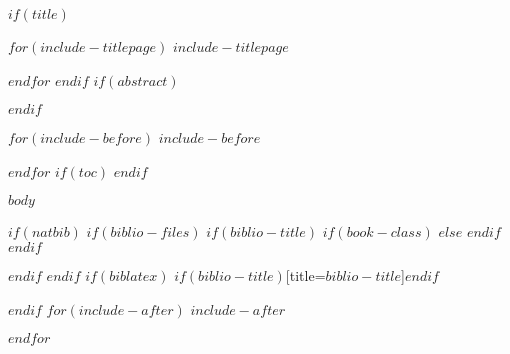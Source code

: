 \documentclass[ openright,titlepage,fleqn,numbers=noenddot,headinclude,
                10pt,a4paper,BCOR5mm,footinclude,cleardoublepage=empty,
                ]{scrreprt}
\author{%
   \authsf  $for(author)$$author$$sep$ \\ $endfor$ \\
    Klinisches Krebsregister \\
    \vspace{20pt} 
   \authsf  \@date 
    }
\begin{document}
$if(title)$

$for(include-titlepage)$
$include-titlepage$

$endfor$
%
\cleardoublepage
$endif$
$if(abstract)$
\begin{abstract}
$abstract$
\end{abstract}
$endif$

$for(include-before)$
$include-before$

$endfor$
$if(toc)$
{
\hypersetup{linkcolor=black}
\setcounter{tocdepth}{$toc-depth$}
\tableofcontents
\cleardoublepage
}
$endif$

\pagestyle{scrheadings}
\clearscrheadfoot
\ohead{{\headmark}}
\cfoot{{\pagemark}}

$body$

$if(natbib)$
$if(biblio-files)$
$if(biblio-title)$
$if(book-class)$
\renewcommand\bibname{$biblio-title$}
$else$
\renewcommand\refname{$biblio-title$}
$endif$
$endif$


$endif$
$endif$
$if(biblatex)$
\printbibliography$if(biblio-title)$[title=$biblio-title$]$endif$

$endif$
$for(include-after)$
$include-after$

$endfor$
\end{document}

